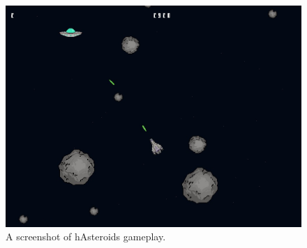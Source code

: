 \documentclass[
  digital, %
  color,   %
  table,   %
  oneside, %
  lof,     %
  lot,     %
]{fithesis3}
\begin{document}
\begin{figure}[hbt!]
    \centering
    \includegraphics[width=0.8 \textwidth]{images/hasteroids-screenshot.jpg}
    \caption{A screenshot of hAsteroids gameplay.}
    \label{fig:hasteroidsscreenshot}
\end{figure}
\end{document}
